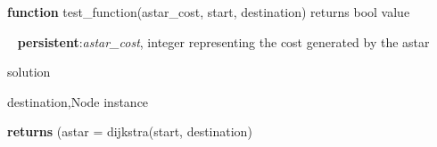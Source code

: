 \documentclass[12pt]{article}
\begin{document}
\vspace{\baselineskip}\begin{adjustwidth}{0.5in}{0.0in}
\begin{justify}
{\fontsize{8pt}{9.6pt}\selectfont \textbf{function }test\_function(astar\_cost, start, destination) returns bool value\par}
\end{justify}\par

\end{adjustwidth}

\begin{justify}
{\fontsize{8pt}{9.6pt}\selectfont \   \tabto{0.75in} \textbf{persistent}:\textit{astar\_cost}, integer representing the cost generated by the astar\par}
\end{justify}\par

\begin{adjustwidth}{0.5in}{0.0in}
\begin{justify}
{\fontsize{8pt}{9.6pt}\selectfont  \tabto{0.75in} \tab \tab solution\par}
\end{justify}\par

\end{adjustwidth}

\begin{adjustwidth}{0.5in}{0.0in}
\begin{justify}
 \tabto{0.75in} \tab {}
\end{justify}\par

\end{adjustwidth}

\begin{adjustwidth}{0.5in}{0.0in}
\begin{justify}
{\fontsize{8pt}{9.6pt}\selectfont  \tabto{0.75in} \tab \tab destination,Node instance\tab \tab \tab \tab \par}
\end{justify}\par

\end{adjustwidth}

\begin{adjustwidth}{0.5in}{0.0in}
\begin{justify}
 \tabto{0.75in} {\fontsize{8pt}{9.6pt}\selectfont \textbf{returns }(astar = dijkstra(start, destination)\par}
\end{justify}\par

\end{adjustwidth}
\end{document}
